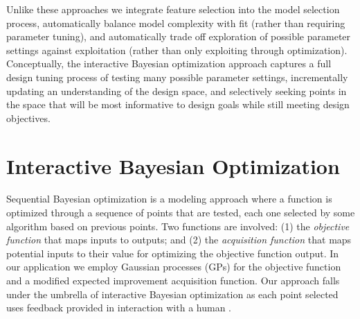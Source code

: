 \documentclass[letterpaper]{article}
\begin{document}
Unlike these approaches we integrate feature selection into the model selection process, automatically balance model complexity with fit (rather than requiring parameter tuning), and automatically trade off exploration of possible parameter settings against exploitation (rather than only exploiting through optimization). Conceptually, the interactive Bayesian optimization approach captures a full design tuning process of testing many possible parameter settings, incrementally updating an understanding of the design space, and selectively seeking points in the space that will be most informative to design goals while still meeting design objectives.








\section{Interactive Bayesian Optimization}
Sequential Bayesian optimization is a modeling approach where a function is optimized through a sequence of points that are tested, each one selected by some algorithm based on previous points. Two functions are involved: (1) the \textit{objective function} that maps inputs to outputs; and (2) the \textit{acquisition function} that maps potential inputs to their value for optimizing the objective function output. In our application we employ Gaussian processes (GPs) for the objective function and a modified expected improvement acquisition function. Our approach falls under the umbrella of interactive Bayesian optimization as each point selected uses feedback provided in interaction with a human \cite{brochu2010:thesis}.
\end{document}
